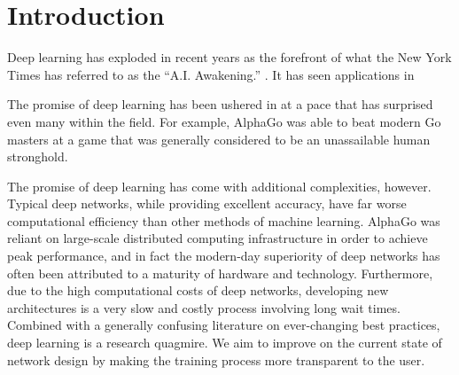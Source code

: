 \chapter{Introduction}

Deep learning has exploded in recent years as the forefront of what the New York Times has referred to as the ``A.I. Awakening.'' \cite{aiawakening}.
It has seen applications in 


The promise of deep learning has been ushered in at a pace that has surprised even many within the field.
For example, AlphaGo \cite{silver2016mastering} was able to beat modern Go masters at a game that was generally considered to be an unassailable human stronghold.

The promise of deep learning has come with additional complexities, however.
Typical deep networks, while providing excellent accuracy, have far worse computational efficiency than other methods of machine learning.
AlphaGo was reliant on large-scale distributed computing infrastructure in order to achieve peak performance, and in fact the modern-day superiority of deep networks has often been attributed to a maturity of hardware and technology.
Furthermore, due to the high computational costs of deep networks, developing new architectures is a very slow and costly process involving long wait times.
Combined with a generally confusing literature on ever-changing best practices, deep learning is a research quagmire.
We aim to improve on the current state of network design by making the training process more transparent to the user.